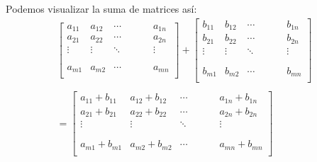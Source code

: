 \documentclass[handout]{beamer} %
\renewcommand{\_}[1]{_{\left[ #1 \right]}}
\renewcommand{\^}[1]{^{\left[ #1 \right]}}
\begin{document}
\begin{frame}
	Podemos visualizar la suma de matrices as\'i:
	\begin{align*}
		\left[
		\begin{array}{ccccccc}
			a_{11} & a_{12} & \cdots & & &  & a_{1n}\\ 
			a_{21} & a_{22} & \cdots & & &  & a_{2n}\\
			\vdots & \vdots & \ddots & & &  & \vdots\\
			& &  & & &  \\
			& &  & & &  \\
			a_{m1} & a_{m2} & \cdots & & & & a_{mn}\\ 
		\end{array}
		\right] 
		+
		\left[
		\begin{array}{ccccccc}
			b_{11} & b_{12} & \cdots & & &  & b_{1n}\\ 
			b_{21} & b_{22} & \cdots & & &  & b_{2n}\\
			\vdots & \vdots & \ddots & & &  & \vdots\\
			& &  & & &  \\
			& &  & & &  \\
			b_{m1} & b_{m2} & \cdots & & & & b_{mn}\\ 
		\end{array}
		\right]
		\\
		\\
		=
		\left[
		\begin{array}{ccccccc}
			a_{11}+b_{11} & a_{12}+b_{12} & \cdots & & &  & a_{1n}+b_{1n}\\ 
			a_{21}+b_{21} & a_{22}+b_{22} & \cdots & & &  & a_{2n}+b_{2n}\\
			\vdots & \vdots & \ddots & & &  & \vdots\\
			& &  & & &  \\
			& &  & & &  \\
			a_{m1}+b_{m1} & a_{m2}+b_{m2} & \cdots & & & & a_{mn}+b_{mn}\\ 
		\end{array}
		\right]
	\end{align*}
\end{frame}
\end{document}
